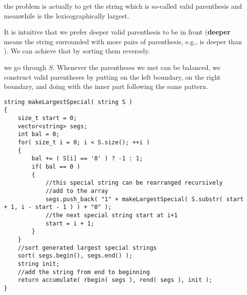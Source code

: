 the problem is actually to get the string which is so-called valid parenthesis and meanwhile is the lexicographically largest.

It is intuitive that we prefer deeper valid parenthesis to be in front (\textbf{deeper} means the string surrounded with more pairs of parenthesis, e.g.,  is deeper than  ). We can achieve that by sorting them reversely.

we go through $S$. Whenever the parentheses we met can be balanced, we construct valid parentheses by putting  on the left boundary,  on the right boundary, and doing with the inner part following the same pattern.

\setcounter{lstlisting}{0}
\begin{lstlisting}[style=customc, caption={DFS}]
string makeLargestSpecial( string S )
{
    size_t start = 0;
    vector<string> segs;
    int bal = 0;
    for( size_t i = 0; i < S.size(); ++i )
    {
        bal += ( S[i] == '0' ) ? -1 : 1;
        if( bal == 0 )
        {
            //this special string can be rearranged recursively
            //add to the array
            segs.push_back( "1" + makeLargestSpecial( S.substr( start + 1, i - start - 1 ) ) + "0" );
            //the next special string start at i+1
            start = i + 1;
        }
    }
    //sort generated largest special strings
    sort( segs.begin(), segs.end() );
    string init;
    //add the string from end to beginning
    return accumulate( rbegin( segs ), rend( segs ), init );
}
\end{lstlisting}